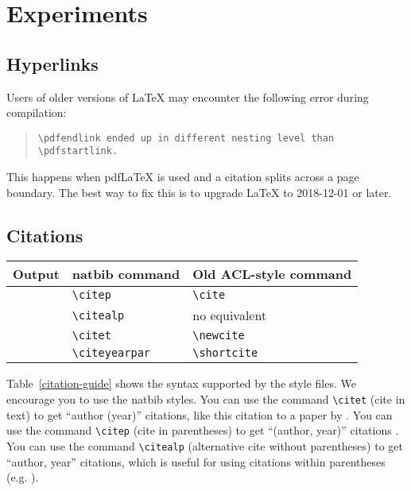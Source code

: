\section{Experiments}
\label{sec:experiment}


\subsection{Hyperlinks}

Users of older versions of \LaTeX{} may encounter the following error during compilation: 
\begin{quote}
	\tt\verb|\pdfendlink| ended up in different nesting level than \verb|\pdfstartlink|.
\end{quote}
This happens when pdf\LaTeX{} is used and a citation splits across a page boundary. The best way to fix this is to upgrade \LaTeX{} to 2018-12-01 or later.

\subsection{Citations}

\begin{table*}
	\centering
	\begin{tabular}{lll}
		\hline
		\textbf{Output} & \textbf{natbib command} & \textbf{Old ACL-style command}\\
		\hline
		\citep{Gusfield:97} & \verb|\citep| & \verb|\cite| \\
		\citealp{Gusfield:97} & \verb|\citealp| & no equivalent \\
		\citet{Gusfield:97} & \verb|\citet| & \verb|\newcite| \\
		\citeyearpar{Gusfield:97} & \verb|\citeyearpar| & \verb|\shortcite| \\
		\hline
	\end{tabular}
	\caption{\label{citation-guide}
		Citation commands supported by the style file.
		The style is based on the natbib package and supports all natbib citation commands.
		It also supports commands defined in previous ACL style files for compatibility.
	}
\end{table*}

Table~\ref{citation-guide} shows the syntax supported by the style files.
We encourage you to use the natbib styles.
You can use the command \verb|\citet| (cite in text) to get ``author (year)'' citations, like this citation to a paper by \citet{Gusfield:97}.
You can use the command \verb|\citep| (cite in parentheses) to get ``(author, year)'' citations \citep{Gusfield:97}.
You can use the command \verb|\citealp| (alternative cite without parentheses) to get ``author, year'' citations, which is useful for using citations within parentheses (e.g. \citealp{Gusfield:97}).

